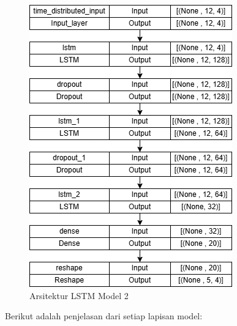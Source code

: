 \begin{figure} [H] \centering
    \includegraphics[scale=0.65]{gambar/lstmmodel2.png} 
    \caption{Arsitektur LSTM Model 2}
    \label{fig:lstm2}
\end{figure}

Berikut adalah penjelasan dari setiap lapisan model:

